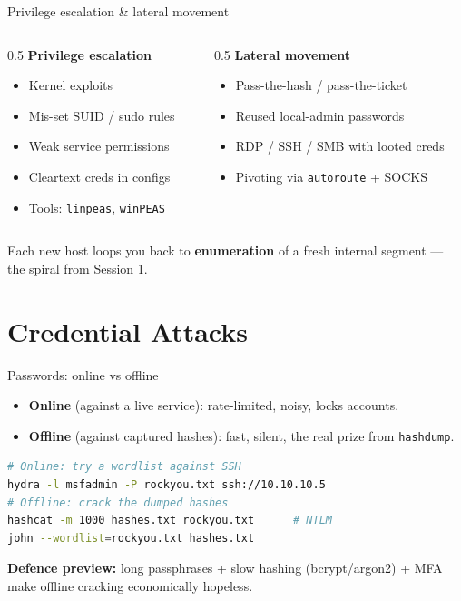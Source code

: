 \documentclass[aspectratio=169,11pt]{beamer}
\begin{document}
\begin{frame}{Privilege escalation \& lateral movement}
  \begin{columns}[T]
    \begin{column}{0.5\textwidth}
      \textbf{Privilege escalation}
      \begin{itemize}\footnotesize
        \item Kernel exploits
        \item Mis-set SUID / sudo rules
        \item Weak service permissions
        \item Cleartext creds in configs
        \item Tools: \texttt{linpeas}, \texttt{winPEAS}
      \end{itemize}
    \end{column}
    \begin{column}{0.5\textwidth}
      \textbf{Lateral movement}
      \begin{itemize}\footnotesize
        \item Pass-the-hash / pass-the-ticket
        \item Reused local-admin passwords
        \item RDP / SSH / SMB with looted creds
        \item Pivoting via \texttt{autoroute} + SOCKS
      \end{itemize}
    \end{column}
  \end{columns}
  \vspace{0.4em}
  \footnotesize Each new host loops you back to \textbf{enumeration} of a fresh
  internal segment --- the spiral from Session 1.
\end{frame}

\section{Credential Attacks}
\begin{frame}[fragile]{Passwords: online vs offline}
  \begin{itemize}\footnotesize
    \item \textbf{Online} (against a live service): rate-limited, noisy, locks
          accounts.
    \item \textbf{Offline} (against captured hashes): fast, silent, the real
          prize from \texttt{hashdump}.
  \end{itemize}
  \begin{lstlisting}[language=bash]
# Online: try a wordlist against SSH
hydra -l msfadmin -P rockyou.txt ssh://10.10.10.5
# Offline: crack the dumped hashes
hashcat -m 1000 hashes.txt rockyou.txt      # NTLM
john --wordlist=rockyou.txt hashes.txt
  \end{lstlisting}
  \footnotesize \textbf{Defence preview:} long passphrases + slow hashing
  (bcrypt/argon2) + MFA make offline cracking economically hopeless.
\end{frame}
\end{document}
